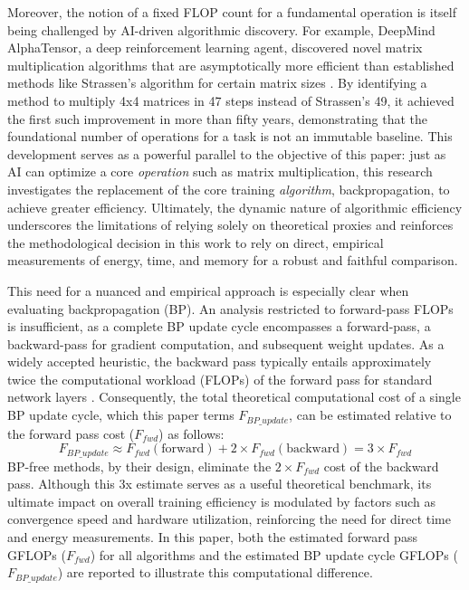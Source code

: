 Moreover, the notion of a fixed FLOP count for a fundamental operation is itself being challenged by AI-driven algorithmic discovery. For example, DeepMind AlphaTensor, a deep reinforcement learning agent, discovered novel matrix multiplication algorithms that are asymptotically more efficient than established methods like Strassen's algorithm for certain matrix sizes \cite{fawzi2022discovering}. By identifying a method to multiply 4x4 matrices in 47 steps instead of Strassen's 49, it achieved the first such improvement in more than fifty years, demonstrating that the foundational number of operations for a task is not an immutable baseline. This development serves as a powerful parallel to the objective of this paper: just as AI can optimize a core \emph{operation} such as matrix multiplication, this research investigates the replacement of the core training \emph{algorithm}, backpropagation, to achieve greater efficiency. Ultimately, the dynamic nature of algorithmic efficiency underscores the limitations of relying solely on theoretical proxies and reinforces the methodological decision in this work to rely on direct, empirical measurements of energy, time, and memory for a robust and faithful comparison.

This need for a nuanced and empirical approach is especially clear when evaluating backpropagation (BP). An analysis restricted to forward-pass FLOPs is insufficient, as a complete BP update cycle encompasses a forward-pass, a backward-pass for gradient computation, and subsequent weight updates. As a widely accepted heuristic, the backward pass typically entails approximately twice the computational workload (FLOPs) of the forward pass for standard network layers \cite{kaplan2020scaling}. Consequently, the total theoretical computational cost of a single BP update cycle, which this paper terms $F_{BP\_update}$, can be estimated relative to the forward pass cost ($F_{fwd}$) as follows:
\begin{equation}
F_{BP\_update} \approx F_{fwd} (\text{forward}) + 2 \times F_{fwd} (\text{backward}) = 3 \times F_{fwd}
\label{eq:bp_update_cost}
\end{equation}
BP-free methods, by their design, eliminate the $2 \times F_{fwd}$ cost of the backward pass. Although this 3x estimate serves as a useful theoretical benchmark, its ultimate impact on overall training efficiency is modulated by factors such as convergence speed and hardware utilization, reinforcing the need for direct time and energy measurements. In this paper, both the estimated forward pass GFLOPs ($F_{fwd}$) for all algorithms and the estimated BP update cycle GFLOPs ($F_{BP\_update}$) are reported to illustrate this computational difference.

